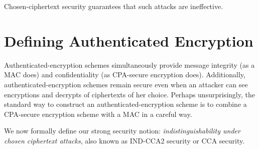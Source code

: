 Chosen-ciphertext security guarantees that such attacks are ineffective.


\section{Defining Authenticated Encryption}

Authenticated-encryption schemes simultaneously provide message 
integrity (as a MAC does) and confidentiality (as CPA-secure encryption does).
Additionally, authenticated-encryption schemes remain secure even when 
an attacker can see encryptions and decrypts of ciphertexts of her choice.
Perhaps unsurprisingly, the standard way to construct an authenticated-encryption
scheme is to combine a CPA-secure encryption scheme with a MAC in a careful way.

We now formally define our strong security notion:
\emph{indistinguishability under chosen ciphertext attacks}, 
also known as IND-CCA2 security or CCA security.

